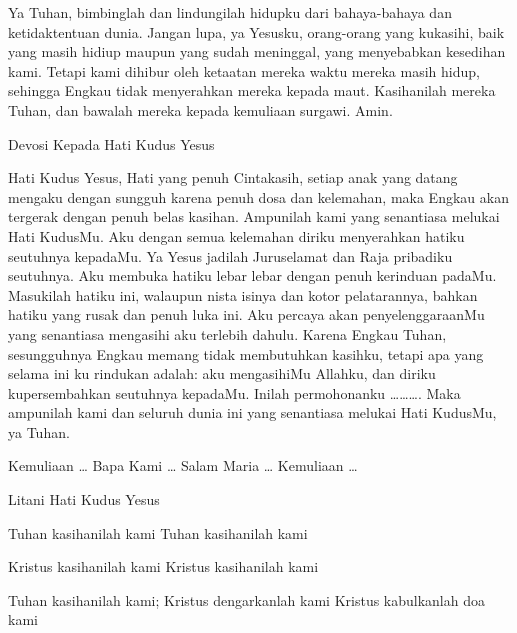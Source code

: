 \documentclass[a5paper,headsepline,titlepage,11pt,nnormalheadings,DIVcalc]{scrbook}
\begin{document}
Ya Tuhan, bimbinglah dan lindungilah hidupku dari bahaya-bahaya dan ketidaktentuan dunia. Jangan lupa, ya Yesusku, orang-orang yang kukasihi, baik yang masih hidiup maupun yang sudah meninggal, yang menyebabkan kesedihan kami. Tetapi kami dihibur oleh ketaatan mereka waktu mereka masih hidup, sehingga Engkau tidak menyerahkan mereka kepada maut. Kasihanilah mereka Tuhan, dan bawalah mereka kepada kemuliaan surgawi. Amin.

Devosi Kepada Hati Kudus Yesus

Hati Kudus Yesus, Hati yang penuh Cintakasih, setiap anak yang datang mengaku dengan sungguh karena penuh dosa dan kelemahan, maka Engkau akan tergerak dengan penuh belas kasihan. Ampunilah kami yang senantiasa melukai Hati KudusMu. Aku dengan semua kelemahan diriku menyerahkan hatiku seutuhnya kepadaMu. Ya Yesus jadilah Juruselamat dan Raja pribadiku seutuhnya. Aku membuka hatiku lebar lebar dengan penuh kerinduan padaMu. Masukilah hatiku ini, walaupun nista isinya dan kotor pelatarannya, bahkan hatiku yang rusak dan penuh luka ini. Aku percaya akan penyelenggaraanMu yang senantiasa mengasihi aku terlebih dahulu. Karena Engkau Tuhan, sesungguhnya Engkau memang tidak membutuhkan kasihku, tetapi apa yang selama ini ku rindukan adalah: aku mengasihiMu Allahku, dan diriku kupersembahkan seutuhnya kepadaMu. Inilah permohonanku ………. Maka ampunilah kami dan seluruh dunia ini yang senantiasa melukai Hati KudusMu, ya Tuhan.

Kemuliaan …
Bapa Kami …
Salam Maria …
Kemuliaan …

Litani Hati Kudus Yesus

Tuhan kasihanilah kami
Tuhan kasihanilah kami

Kristus kasihanilah kami
Kristus kasihanilah kami

Tuhan kasihanilah kami; Kristus dengarkanlah kami
Kristus kabulkanlah doa kami
\end{document}
